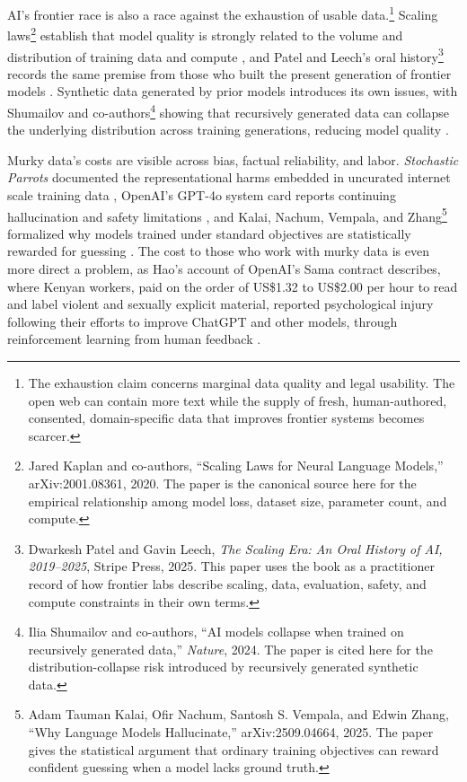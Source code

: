 \documentclass[10pt,a4paper,twocolumn]{article}
\begin{document}
AI's frontier race is also a race against the exhaustion of usable data.\footnote{The exhaustion claim concerns marginal data quality and legal usability. The open web can contain more text while the supply of fresh, human-authored, consented, domain-specific data that improves frontier systems becomes scarcer.} Scaling laws\footnote{Jared Kaplan and co-authors, ``Scaling Laws for Neural Language Models,'' arXiv:2001.08361, 2020. The paper is the canonical source here for the empirical relationship among model loss, dataset size, parameter count, and compute.} establish that model quality is strongly related to the volume and distribution of training data and compute \citep{kaplan2020scaling}, and Patel and Leech's oral history\footnote{Dwarkesh Patel and Gavin Leech, \emph{The Scaling Era: An Oral History of AI, 2019--2025}, Stripe Press, 2025. This paper uses the book as a practitioner record of how frontier labs describe scaling, data, evaluation, safety, and compute constraints in their own terms.} records the same premise from those who built the present generation of frontier models \citep{patel2025scaling}. Synthetic data generated by prior models introduces its own issues, with Shumailov and co-authors\footnote{Ilia Shumailov and co-authors, ``AI models collapse when trained on recursively generated data,'' \emph{Nature}, 2024. The paper is cited here for the distribution-collapse risk introduced by recursively generated synthetic data.} showing that recursively generated data can collapse the underlying distribution across training generations, reducing model quality \citep{shumailov2024modelcollapse}.

Murky data's costs are visible across bias, factual reliability, and labor. \emph{Stochastic Parrots} documented the representational harms embedded in uncurated internet scale training data \citep{bender2021parrots}, OpenAI's GPT-4o system card reports continuing hallucination and safety limitations \citep{openai2024gpt4osystemcard}, and Kalai, Nachum, Vempala, and Zhang\footnote{Adam Tauman Kalai, Ofir Nachum, Santosh S. Vempala, and Edwin Zhang, ``Why Language Models Hallucinate,'' arXiv:2509.04664, 2025. The paper gives the statistical argument that ordinary training objectives can reward confident guessing when a model lacks ground truth.} formalized why models trained under standard objectives are statistically rewarded for guessing \citep{kalai2025whyhallucinate}. The cost to those who work with murky data is even more direct a problem, as Hao's account of OpenAI's Sama contract describes, where Kenyan workers, paid on the order of US\$1.32 to US\$2.00 per hour to read and label violent and sexually explicit material, reported psychological injury following their efforts to improve ChatGPT and other models, through reinforcement learning from human feedback \citep[ch.~9]{hao2025empire}.
\end{document}
